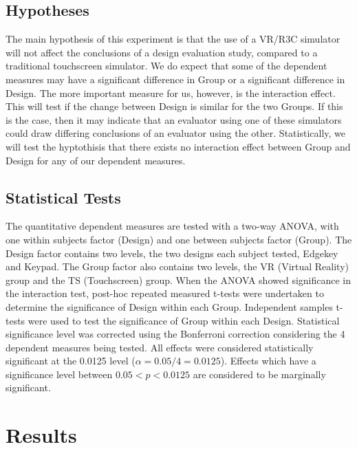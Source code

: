 \subsection{Hypotheses}

The main hypothesis of this experiment is that the use of a VR/R3C simulator will not affect the conclusions of a design evaluation study, compared to a traditional touchscreen simulator.
We do expect that some of the dependent measures may have a significant difference in Group or a significant difference in Design.
The more important measure for us, however, is the interaction effect.
This will test if the change between Design is similar for the two Groups.
If this is the case, then it may indicate that an evaluator using one of these simulators could draw differing conclusions of an evaluator using the other.
Statistically, we will test the hyptothisis that there exists no interaction effect between Group and Design for any of our dependent measures.


\subsection{Statistical Tests}

The quantitative dependent measures are tested with a two-way ANOVA, with one within subjects factor (Design) and one between subjects factor (Group).
The Design factor contains two levels, the two designs each subject tested, Edgekey and Keypad.
The Group factor also contains two levels, the VR (Virtual Reality) group and the TS (Touchscreen) group.
When the ANOVA showed significance in the interaction test, post-hoc repeated measured t-tests were undertaken to determine the significance of Design within each Group.
Independent samples t-tests were used to test the significance of Group within each Design.
Statistical significance level was corrected using the Bonferroni correction considering the 4 dependent measures being tested.
All effects were considered statistically significant at the 0.0125 level ($\alpha = 0.05/4 = 0.0125$).
Effects which have a significance level between $0.05<p<0.0125$ are considered to be marginally significant.

\section{Results}

